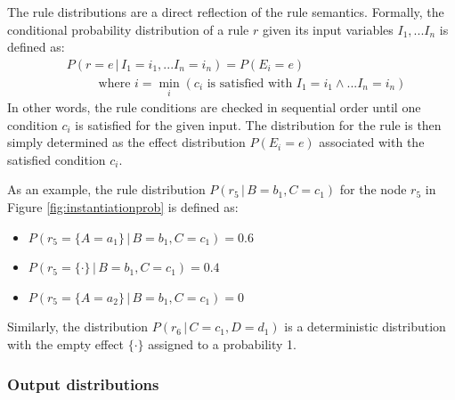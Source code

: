 The rule distributions are a direct reflection of the rule semantics.  Formally, the conditional probability distribution of a rule $r$ given its input variables $I_1,...I_n$ is defined as: 
\begin{align}
& P(r\!=\!e \, | \, I_1\!=\!i_1,... I_n\!=\!i_n) = P(E_i = e) \label{eq:ruledistrib}
 \\ 
& \; \; \; \; \; \; \; \; \text{ where } i = \min_i (c_i \text{ is satisfied with } I_1\!=\!i_1 \land ... I_n\!=\!i_n) \nonumber 
\end{align}
In other words, the rule conditions are checked in sequential order until one condition $c_i$ is satisfied for the given input.  The distribution for the rule is then simply determined as the effect distribution $P(E_i\!=\!e)$ associated with the satisfied condition $c_i$. 

As an example, the rule distribution $P(r_5 \, | \, B\!=\!b_1, C\!=\!c_1)$ for the node $r_5$ in Figure \ref{fig:instantiationprob} is defined as:
\begin{itemize}
\item $P(r_5 = \{A\!=\!a_1\} \, | \, B\!=\!b_1, C\!=\!c_1) = 0.6$
\item  $P(r_5 = \{\cdot\} \, | \, B\!=\!b_1, C\!=\!c_1) = 0.4$
\item $P(r_5 = \{A\!=\!a_2\} \, | \, B\!=\!b_1, C\!=\!c_1) = 0$
\end{itemize}
Similarly, the distribution $P(r_6 \, | \, C\!=\!c_1, D\!=\!d_1)$ is a deterministic distribution with the empty effect $\{\cdot\}$ assigned to a probability 1. 

\subsubsection*{Output distributions} 

